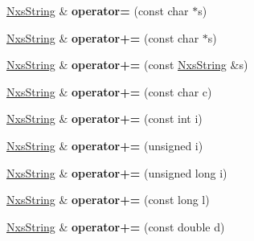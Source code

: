 \begin{DoxyCompactItemize}
\item 
\hypertarget{classNxsString_a3636754537192607f211d480f4dfc8cc}{
\hyperlink{classNxsString}{NxsString} \& {\bfseries operator=} (const char $\ast$s)}
\label{classNxsString_a3636754537192607f211d480f4dfc8cc}

\item 
\hypertarget{classNxsString_a4bde9ea22d1e7abed52915e4c6d84b77}{
\hyperlink{classNxsString}{NxsString} \& {\bfseries operator+=} (const char $\ast$s)}
\label{classNxsString_a4bde9ea22d1e7abed52915e4c6d84b77}

\item 
\hypertarget{classNxsString_abf63038f2b7fe55448c0e621295dedf1}{
\hyperlink{classNxsString}{NxsString} \& {\bfseries operator+=} (const \hyperlink{classNxsString}{NxsString} \&s)}
\label{classNxsString_abf63038f2b7fe55448c0e621295dedf1}

\item 
\hypertarget{classNxsString_ad91ba6b582a1b33184d72885363410fe}{
\hyperlink{classNxsString}{NxsString} \& {\bfseries operator+=} (const char c)}
\label{classNxsString_ad91ba6b582a1b33184d72885363410fe}

\item 
\hypertarget{classNxsString_a4bd658ece3ab00a7a1c2789d80f42d3e}{
\hyperlink{classNxsString}{NxsString} \& {\bfseries operator+=} (const int i)}
\label{classNxsString_a4bd658ece3ab00a7a1c2789d80f42d3e}

\item 
\hypertarget{classNxsString_acb657c1ad600c857f42a737bd5f3f58a}{
\hyperlink{classNxsString}{NxsString} \& {\bfseries operator+=} (unsigned i)}
\label{classNxsString_acb657c1ad600c857f42a737bd5f3f58a}

\item 
\hypertarget{classNxsString_a7329e333b6ed7b9caef4102c5bcd5106}{
\hyperlink{classNxsString}{NxsString} \& {\bfseries operator+=} (unsigned long i)}
\label{classNxsString_a7329e333b6ed7b9caef4102c5bcd5106}

\item 
\hypertarget{classNxsString_a2b564181063eb188be85e5c15dc199e7}{
\hyperlink{classNxsString}{NxsString} \& {\bfseries operator+=} (const long l)}
\label{classNxsString_a2b564181063eb188be85e5c15dc199e7}

\item 
\hypertarget{classNxsString_a22901e23a358cdd6f4f7b920cdd5d897}{
\hyperlink{classNxsString}{NxsString} \& {\bfseries operator+=} (const double d)}
\label{classNxsString_a22901e23a358cdd6f4f7b920cdd5d897}


\end{DoxyCompactItemize}
